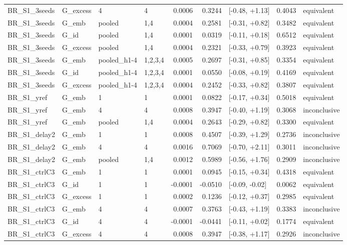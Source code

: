 \begin{tabular}{llllrrlrl}
BR\_S1\_3seeds & G\_excess & 4 & 4 & 0.0006 & 0.3244 & [-0.48, +1.13] & 0.4043 & equivalent \\
BR\_S1\_3seeds & G\_emb & pooled & 1,4 & 0.0004 & 0.2581 & [-0.31, +0.82] & 0.3482 & equivalent \\
BR\_S1\_3seeds & G\_id & pooled & 1,4 & 0.0001 & 0.0319 & [-0.11, +0.18] & 0.6512 & equivalent \\
BR\_S1\_3seeds & G\_excess & pooled & 1,4 & 0.0004 & 0.2321 & [-0.33, +0.79] & 0.3923 & equivalent \\
BR\_S1\_3seeds & G\_emb & pooled\_h1-4 & 1,2,3,4 & 0.0005 & 0.2697 & [-0.31, +0.85] & 0.3354 & equivalent \\
BR\_S1\_3seeds & G\_id & pooled\_h1-4 & 1,2,3,4 & 0.0001 & 0.0550 & [-0.08, +0.19] & 0.4169 & equivalent \\
BR\_S1\_3seeds & G\_excess & pooled\_h1-4 & 1,2,3,4 & 0.0004 & 0.2452 & [-0.33, +0.82] & 0.3807 & equivalent \\
BR\_S1\_yref & G\_emb & 1 & 1 & 0.0001 & 0.0822 & [-0.17, +0.34] & 0.5018 & equivalent \\
BR\_S1\_yref & G\_emb & 4 & 4 & 0.0008 & 0.3947 & [-0.40, +1.19] & 0.3068 & inconclusive \\
BR\_S1\_yref & G\_emb & pooled & 1,4 & 0.0004 & 0.2643 & [-0.29, +0.82] & 0.3300 & equivalent \\
BR\_S1\_delay2 & G\_emb & 1 & 1 & 0.0008 & 0.4507 & [-0.39, +1.29] & 0.2736 & inconclusive \\
BR\_S1\_delay2 & G\_emb & 4 & 4 & 0.0016 & 0.7069 & [-0.70, +2.11] & 0.3011 & inconclusive \\
BR\_S1\_delay2 & G\_emb & pooled & 1,4 & 0.0012 & 0.5989 & [-0.56, +1.76] & 0.2909 & inconclusive \\
BR\_S1\_ctrlC3 & G\_emb & 1 & 1 & 0.0001 & 0.0945 & [-0.15, +0.34] & 0.4318 & equivalent \\
BR\_S1\_ctrlC3 & G\_id & 1 & 1 & -0.0001 & -0.0510 & [-0.09, -0.02] & 0.0062 & equivalent \\
BR\_S1\_ctrlC3 & G\_excess & 1 & 1 & 0.0002 & 0.1236 & [-0.12, +0.37] & 0.2985 & equivalent \\
BR\_S1\_ctrlC3 & G\_emb & 4 & 4 & 0.0007 & 0.3763 & [-0.43, +1.19] & 0.3383 & inconclusive \\
BR\_S1\_ctrlC3 & G\_id & 4 & 4 & -0.0001 & -0.0441 & [-0.11, +0.02] & 0.1774 & equivalent \\
BR\_S1\_ctrlC3 & G\_excess & 4 & 4 & 0.0008 & 0.3947 & [-0.38, +1.17] & 0.2926 & inconclusive \\

\end{tabular}
